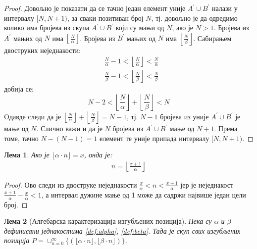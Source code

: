 \documentclass[a4paper]{article}
\newtheorem{lemma}{Лема}
\begin{document}
\begin{proof}
	Довољно је показати да се тачно један елемент уније $ A^{'} \cup B^{'} $ налази у интервалу $ [N,N+1) $, за сваки позитиван број $ N $, тј. довољно је да одредимо колико има бројева из скупа $ A^{'} \cup B^{'} $ који су мањи од $ N $, ако је $ N > 1 $. Бројева из $ A^{'} $ мањих од $ N $ има $ \left\lfloor \frac{N}{\alpha} \right\rfloor $. Бројева из $ B^{'} $ мањих од $ N $ има $ \left\lfloor \frac{N}{\beta} \right\rfloor $. Сабирањем двоструких неједнакости:
		\begin{eqnarray*}
			&\frac{N}{\alpha} - 1 < \left\lfloor \frac{N}{\alpha} \right\rfloor < \frac{N}{\alpha}\\
			&\frac{N}{\beta} - 1 < \left\lfloor \frac{N}{\beta} \right\rfloor < \frac{N}{\beta}
		\end{eqnarray*}	
	добија се:
		\begin{displaymath}
		N - 2 < \left\lfloor \frac{N}{\alpha} \right\rfloor + \left\lfloor \frac{N}{\beta} \right\rfloor < N
		\end{displaymath} 	
	Oдавде следи да је $ \left\lfloor \frac{N}{\alpha} \right\rfloor + \left\lfloor \frac{N}{\beta} \right\rfloor = N - 1 $, тј. $ N - 1 $ бројева из уније $ A^{'} \cup B^{'} $ је мање од $ N $. Слично важи и да је $ N $ бројева из $ A^{'} \cup B^{'} $ мање од $ N + 1 $. Према томе, тачно $ N - (N - 1) = 1 $ елемент те уније припада интервалу $ [N,N+1) $.
\end{proof}

\begin{lemma}
	\label{lemma:n}
	Ако је $ \lfloor \alpha \cdot n \rfloor = x $, онда је:
		\begin{eqnarray*}
			n = \left\lfloor \frac{x+1}{\alpha} \right\rfloor
		\end{eqnarray*}
\end{lemma}

\begin{proof}
	Ово следи из двоструке неједнакости $ \frac{x}{\alpha}<n<\frac{x+1}{\alpha} $ јер је неједнакост $ \frac{x+1}{\alpha} - \frac{x}{\alpha} < 1 $, а интервал дужине мање од 1 може да садржи највише један цели број.
\end{proof}

\begin{lemma}[Алгебарска карактеризација изгубљених позиција] Нека су $ \alpha $ и $ \beta $ дефинисани једнакостима \eqref{def:alpha}, \eqref{def:beta}. Тада је скуп свих изгубљених позиција $ P = \cup_{n=0}^{\infty} \{(\lfloor \alpha \cdot n \rfloor, \lfloor \beta \cdot n \rfloor)\} $.
\end{lemma}
\end{document}
